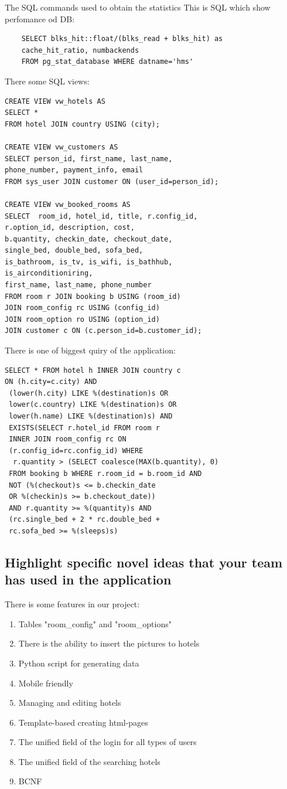 \documentclass{sig-alternate-05-2015}
\begin{document}
{The SQL commands used to obtain the statistics}
This is SQL which show perfomance od DB:
\begin{verbatim}
	SELECT blks_hit::float/(blks_read + blks_hit) as 
	cache_hit_ratio, numbackends 
	FROM pg_stat_database WHERE datname='hms'
\end{verbatim}
There some SQL views:
\begin{verbatim}
CREATE VIEW vw_hotels AS
SELECT *
FROM hotel JOIN country USING (city);

CREATE VIEW vw_customers AS
SELECT person_id, first_name, last_name, 
phone_number, payment_info, email
FROM sys_user JOIN customer ON (user_id=person_id);

CREATE VIEW vw_booked_rooms AS
SELECT  room_id, hotel_id, title, r.config_id, 
r.option_id, description, cost,
b.quantity, checkin_date, checkout_date,
single_bed, double_bed, sofa_bed,
is_bathroom, is_tv, is_wifi, is_bathhub, 
is_airconditioniring,
first_name, last_name, phone_number
FROM room r JOIN booking b USING (room_id)
JOIN room_config rc USING (config_id)
JOIN room_option ro USING (option_id)
JOIN customer c ON (c.person_id=b.customer_id);
\end{verbatim}
There is one of biggest quiry of the application:
\begin{verbatim}
SELECT * FROM hotel h INNER JOIN country c 
ON (h.city=c.city) AND
 (lower(h.city) LIKE %(destination)s OR 
 lower(c.country) LIKE %(destination)s OR 
 lower(h.name) LIKE %(destination)s) AND 
 EXISTS(SELECT r.hotel_id FROM room r 
 INNER JOIN room_config rc ON 
 (r.config_id=rc.config_id) WHERE
  r.quantity > (SELECT coalesce(MAX(b.quantity), 0) 
 FROM booking b WHERE r.room_id = b.room_id AND 
 NOT (%(checkout)s <= b.checkin_date 
 OR %(checkin)s >= b.checkout_date)) 
 AND r.quantity >= %(quantity)s AND 
 (rc.single_bed + 2 * rc.double_bed + 
 rc.sofa_bed >= %(sleeps)s)
\end{verbatim}

\subsection{Highlight specific novel ideas that your team has used in the application}
There is some features in our project:
\begin{enumerate}
	\item Tables "room\_config" and "room\_options"
	\item There is the ability to insert the pictures to hotels
	\item Python script for generating data
	\item Mobile friendly
	\item Managing and editing hotels
	\item Template-based creating html-pages
	\item The unified field of the login for all types of users
	\item The unified field of the searching hotels
	\item BCNF
\end{enumerate}
\end{document}
